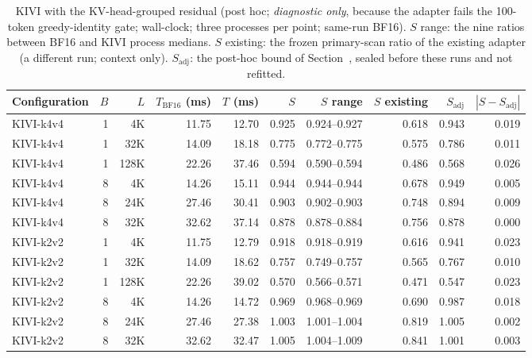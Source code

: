 \begin{table}[t]
\caption{KIVI with the KV-head-grouped residual (post hoc; \emph{diagnostic only}, because the adapter fails the 100-token greedy-identity gate; wall-clock; three processes per point; same-run BF16).
$S$ range: the nine ratios between BF16 and KIVI process medians.
$S$ existing: the frozen primary-scan ratio of the existing adapter (a different run; context only).
$S_{\mathrm{adj}}$: the post-hoc bound of Section~, sealed before these runs and not refitted.}
\label{tab:add-kivi}
\vskip 0.1in
\centering
\footnotesize
\setlength{\tabcolsep}{4pt}
\begin{tabular}{@{}lrrrrrrrrr@{}}
\toprule
Configuration & $B$ & $L$ & $T_{\mathrm{BF16}}$ (ms) & $T$ (ms) & $S$ & $S$ range & $S$ existing & $S_{\mathrm{adj}}$ & $|S - S_{\mathrm{adj}}|$ \\
\midrule
KIVI-k4v4 & 1 & 4K & 11.75 & 12.70 & 0.925 & 0.924--0.927 & 0.618 & 0.943 & 0.019 \\
KIVI-k4v4 & 1 & 32K & 14.09 & 18.18 & 0.775 & 0.772--0.775 & 0.575 & 0.786 & 0.011 \\
KIVI-k4v4 & 1 & 128K & 22.26 & 37.46 & 0.594 & 0.590--0.594 & 0.486 & 0.568 & 0.026 \\
KIVI-k4v4 & 8 & 4K & 14.26 & 15.11 & 0.944 & 0.944--0.944 & 0.678 & 0.949 & 0.005 \\
KIVI-k4v4 & 8 & 24K & 27.46 & 30.41 & 0.903 & 0.902--0.903 & 0.748 & 0.894 & 0.009 \\
KIVI-k4v4 & 8 & 32K & 32.62 & 37.14 & 0.878 & 0.878--0.884 & 0.756 & 0.878 & 0.000 \\
KIVI-k2v2 & 1 & 4K & 11.75 & 12.79 & 0.918 & 0.918--0.919 & 0.616 & 0.941 & 0.023 \\
KIVI-k2v2 & 1 & 32K & 14.09 & 18.62 & 0.757 & 0.749--0.757 & 0.565 & 0.767 & 0.010 \\
KIVI-k2v2 & 1 & 128K & 22.26 & 39.02 & 0.570 & 0.566--0.571 & 0.471 & 0.547 & 0.023 \\
KIVI-k2v2 & 8 & 4K & 14.26 & 14.72 & 0.969 & 0.968--0.969 & 0.690 & 0.987 & 0.018 \\
KIVI-k2v2 & 8 & 24K & 27.46 & 27.38 & 1.003 & 1.001--1.004 & 0.819 & 1.005 & 0.002 \\
KIVI-k2v2 & 8 & 32K & 32.62 & 32.47 & 1.005 & 1.004--1.009 & 0.841 & 1.001 & 0.003 \\
\bottomrule
\end{tabular}
\end{table}

